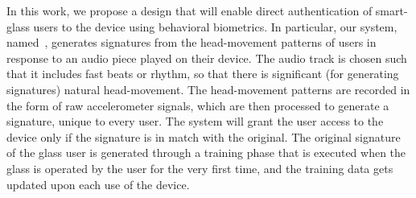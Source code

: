In this work, we propose a design that will enable direct authentication 
of smart-glass users to the device using behavioral biometrics.
In particular, our system, named~\systemname, 
generates signatures from the head-movement patterns of users in response to 
an audio piece played on their device. The audio track is chosen such that
it includes fast beats or rhythm, so that there is significant 
(for generating signatures) natural head-movement.
The head-movement patterns are recorded in the form of 
raw accelerometer signals, which are then processed to generate 
a signature, unique to every user. The system will grant the user access to 
the device only if the signature is in match with the original.
The original signature of the glass user is generated through a 
training phase that is executed when the glass is operated 
by the user for the very first time, and the training data gets
updated upon each use of the device. 


